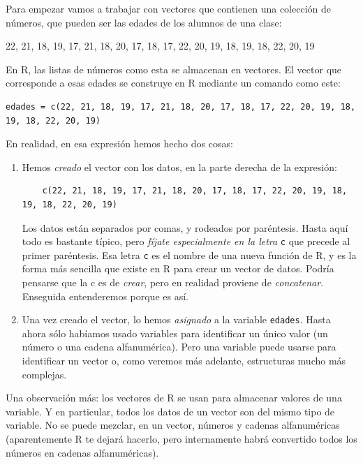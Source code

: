 \documentclass[10pt,a4paper]{article}\usepackage[]{graphicx}\usepackage[]{color}
\newcounter {cont01}
\begin{document}
Para empezar vamos a trabajar con vectores que contienen una colección de números, que pueden ser las edades de los alumnos de una clase:
\begin{center}
22, 21, 18, 19, 17, 21, 18, 20, 17, 18, 17, 22, 20, 19, 18, 19, 18, 22, 20, 19
\end{center}
En R, las listas de números como esta se almacenan en vectores. El vector que corresponde a esas edades se construye en R mediante un comando como este:
{\small
\begin{verbatim}
edades = c(22, 21, 18, 19, 17, 21, 18, 20, 17, 18, 17, 22, 20, 19, 18, 19, 18, 22, 20, 19)
\end{verbatim}
}
En realidad, en esa expresión hemos hecho dos cosas:
\begin{enumerate}
  \item Hemos {\em creado} el vector con los datos, en la parte derecha de la expresión:
    {\small
    \begin{verbatim}
    c(22, 21, 18, 19, 17, 21, 18, 20, 17, 18, 17, 22, 20, 19, 18, 19, 18, 22, 20, 19)
    \end{verbatim}
    }
    Los datos están separados por comas, y rodeados por paréntesis. Hasta aquí todo es bastante típico, pero {\em fíjate especialmente en la letra} {\tt c} que precede al primer paréntesis. Esa letra {\tt c} es el nombre de una nueva función de R, y es la forma más sencilla que existe en R para crear un vector de datos. Podría pensarse que la c es de {\em crear}, pero en realidad proviene de {\em concatenar}. Enseguida entenderemos porque es así.

  \item Una vez creado el vector, lo hemos {\em asignado} a la variable {\tt edades}. Hasta ahora sólo habíamos usado variables para identificar un único valor (un número o una cadena alfanumérica). Pero una variable puede usarse para identificar un vector o, como  veremos más adelante, estructuras mucho más complejas.

\end{enumerate}
Una observación más: los vectores de R se usan para almacenar valores de una variable. Y en particular, todos los datos de un vector son del mismo tipo de variable. No se puede mezclar, en un vector, números y cadenas alfanuméricas (aparentemente R te dejará hacerlo, pero internamente habrá convertido todos los números en cadenas alfanuméricas).\\
\end{document}
